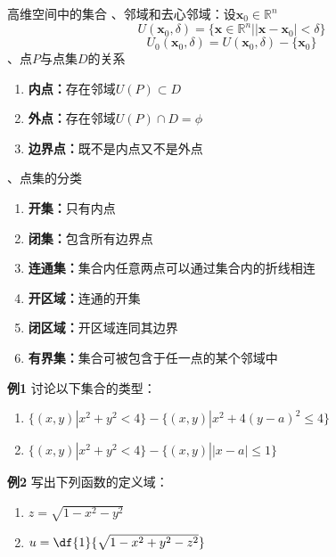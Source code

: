 \begin{frame}{高维空间中的集合}
	\linespread{1.2}\pause 
	{、邻域和去心邻域：}设$\bm{x}_0\in\mathbb{R}^n$\pause 
	$$U(\bm{x}_0,\delta)=\{\bm{x}\in\mathbb{R}^n||\bm{x}-\bm{x}_0|<\delta\}$$\pause 
	\vspace{-2em}
	$$U_0(\bm{x}_0,\delta)=U(\bm{x}_0,\delta)-\{\bm{x}_0\}$$\pause 
	{、点$P$与点集$D$的关系}\pause 
	\begin{enumerate}
	  \item {\bf 内点：}存在邻域$U(P)\subset D$\pause 
	  \item {\bf 外点：}存在邻域$U(P)\cap D=\phi$\pause 
	  \item {\bf 边界点：}既不是内点又不是外点
	\end{enumerate}
\end{frame}

\begin{frame}
	\linespread{1.2}
	{、点集的分类}
	\begin{enumerate}\pause 
	  \item {\bf 开集：}只有内点\pause 
	  \item {\bf 闭集：}包含所有边界点\pause 
	  \item {\bf 连通集：}集合内任意两点可以通过集合内的折线相连\pause 
	  \item {\bf 开区域：}连通的开集\pause 
	  \item {\bf 闭区域：}开区域连同其边界\pause 
	  \item {\bf 有界集：}集合可被包含于任一点的某个邻域中
	\end{enumerate}
\end{frame}

\begin{frame}
	\linespread{1.5}
	\begin{exampleblock}{{\bf 例1}\hfill}
		讨论以下集合的类型：
		\begin{enumerate}
		  \item $\{(x,y)|x^2+y^2<4\}-\{(x,y)|x^2+4(y-a)^2\leq 4\}$
		  \item $\{(x,y)|x^2+y^2<4\}-\{(x,y)||x-a|\leq 1\}$
		\end{enumerate}
	\end{exampleblock}\pause 
	\begin{exampleblock}{{\bf 例2}\hfill}
		写出下列函数的定义域：
		\begin{enumerate}
		  \item $z=\sqrt{1-x^2-y^2}$
		  \item $u=\df{1}{\sqrt{1-x^2+y^2-z^2}}$
		\end{enumerate}
	\end{exampleblock}
\end{frame}

